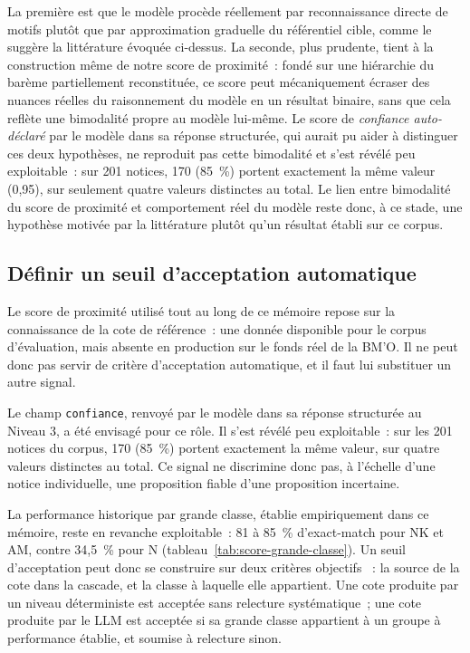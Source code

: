 La première est que le modèle procède réellement par reconnaissance directe de motifs plutôt que par approximation graduelle du référentiel cible, comme le suggère la littérature évoquée ci-dessus. La seconde, plus prudente, tient à la construction même de notre score de proximité~: fondé sur une hiérarchie du barème partiellement reconstituée, ce score peut mécaniquement écraser des nuances réelles du raisonnement du modèle en un résultat binaire, sans que cela reflète une bimodalité propre au modèle lui-même. Le score de \emph{confiance auto-déclaré} par le modèle dans sa réponse structurée, qui aurait pu aider à distinguer ces deux hypothèses, ne reproduit pas cette bimodalité et s'est révélé peu exploitable~: sur 201 notices, 170 (85~\%) portent exactement la même valeur (0,95), sur seulement quatre valeurs distinctes au total. Le lien entre bimodalité du score de proximité et comportement réel du modèle reste donc, à ce stade, une hypothèse motivée par la littérature plutôt qu'un résultat établi sur ce corpus.


\subsection{Définir un seuil d'acceptation automatique}
\label{sec:seuil-acceptation}

Le score de proximité utilisé tout au long de ce mémoire repose sur la connaissance de la cote de référence~: une donnée disponible pour le corpus d'évaluation, mais absente en production sur le fonds réel de la BM'O. Il ne peut donc pas servir de critère d'acceptation automatique, et il faut lui substituer un autre signal.

Le champ \texttt{confiance}, renvoyé par le modèle dans sa réponse structurée au Niveau 3, a été envisagé pour ce rôle. Il s'est révélé peu exploitable~: sur les 201 notices du corpus, 170 (85~\%) portent exactement la même valeur, sur quatre valeurs distinctes au total. Ce signal ne discrimine donc pas, à l'échelle d'une notice individuelle, une proposition fiable d'une proposition incertaine.

La performance historique par grande classe, établie empiriquement dans ce mémoire, reste en revanche exploitable~: 81 à 85~\% d'exact-match pour NK et AM, contre 34,5~\% pour N (tableau~\ref{tab:score-grande-classe}). Un seuil d'acceptation peut donc se construire sur deux critères objectifs ~: la source de la cote dans la cascade, et la classe à laquelle elle appartient. Une cote produite par un niveau déterministe est acceptée sans relecture systématique~; une cote produite par le LLM est acceptée si sa grande classe appartient à un groupe à performance établie, et soumise à relecture sinon.

